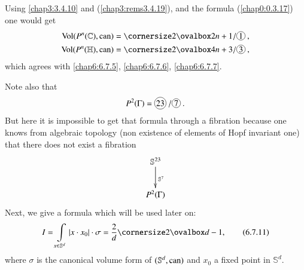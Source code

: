 \setcounter{subsection}{9}

\subsection{}\label{chap6:6.7.10}

\begin{remark*}
Using \eqref{chap3:3.4.10} and (\ref{chap3:rems3.4.19}), and the formula
(\ref{chap0:0.3.17}) one would get
\begin{align*}
\Vol(P^{n}(\mathbb{C}),\can) &= \oval{2n+1}/\mycirc{1},\\
\Vol(P^{n}(\mathbb{H}),\can) &= \oval{4n+3}/\mycirc{3},
\end{align*}
which agrees with \eqref{chap6:6.7.5}, \eqref{chap6:6.7.6}, \eqref{chap6:6.7.7}.

Note also that
$$
P^{2}(\Gamma)=\mycirc{23}/\mycirc{7}.
$$
But here it is impossible to get that formula through a fibration
because one knows from algebraic topology (non existence of elements
of Hopf invariant one) that there does not exist a fibration
\[
\xymatrix{
\mathbb{S}^{23}\ar[d]^{\mathbb{S}^{7}}\\
P^{2}(\Gamma)
}
\]
Next, we give a formula which will be used later on:
\begin{equation*}
I=\int\limits_{x\in\mathbb{S}^{d}}|x\cdot x_{0}|\cdot\sigma=
\frac{2}{d}\oval{d-1},\tag{6.7.11}\label{chap6:6.7.11}
\end{equation*}
where $\sigma$ is the canonical volume form of $(\mathbb{S}^{d},\operatorname{can})$
and $x_{0}$ a fixed point in $\mathbb{S}^{d}$. 
\end{remark*}

